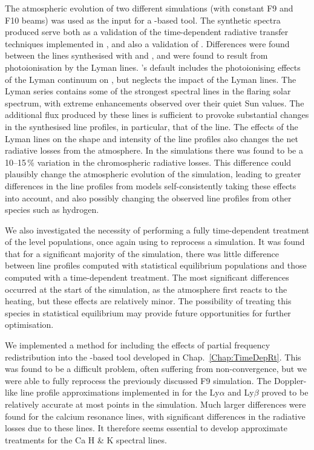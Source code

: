 The atmospheric evolution of two different \Radyn{} simulations (with constant F9 and F10 beams) was used as the input for a \Lw{}-based tool.
The synthetic spectra produced serve both as a validation of the time-dependent radiative transfer techniques implemented in \Lw{}, and also a validation of \Radyn{}.
Differences were found between the \Caii{} lines synthesised with \Radyn{} and \Lw{}, and were found to result from photoionisation by the Lyman lines.
\Radyn{}'s default includes the photoionising effects of the Lyman continuum on \Caii{}, but neglects the impact of the Lyman lines.
The Lyman series contains some of the strongest spectral lines in the flaring solar spectrum, with extreme enhancements observed over their quiet Sun values.
The additional flux produced by these lines is sufficient to provoke substantial changes in the synthesised \Caii{} line profiles, in particular, that of the \CaLine{} line.
The effects of the Lyman lines on the shape and intensity of the \Caii{} line profiles also changes the net radiative losses from the atmosphere.
In the simulations there was found to be a 10--15\,\% variation in the chromospheric radiative losses.
This difference could plausibly change the atmospheric evolution of the simulation, leading to greater differences in the \Caii{} line profiles from models self-consistently taking these effects into account, and also possibly changing the observed line profiles from other species such as hydrogen.

We also investigated the necessity of performing a fully time-dependent treatment of the \Caii{} level populations, once again using \Lw{} to reprocess a \Radyn{} simulation.
It was found that for a significant majority of the simulation, there was little difference between line profiles computed with statistical equilibrium populations and those computed with a time-dependent treatment.
The most significant differences occurred at the start of the simulation, as the atmosphere first reacts to the heating, but these effects are relatively minor.
The possibility of treating this species in statistical equilibrium may provide future opportunities for further optimisation.

We implemented a method for including the effects of partial frequency redistribution into the \Lw{}-based tool developed in Chap.~\ref{Chap:TimeDepRt}.
This was found to be a difficult problem, often suffering from non-convergence, but we were able to fully reprocess the previously discussed F9 simulation.
The Doppler-like line profile approximations implemented in \Radyn{} for the Ly$\alpha$ and Ly$\beta$ proved to be relatively accurate at most points in the simulation.
Much larger differences were found for the calcium resonance lines, with significant differences in the radiative losses due to these lines.
It therefore seems essential to develop approximate treatments for the Ca H \& K spectral lines.

